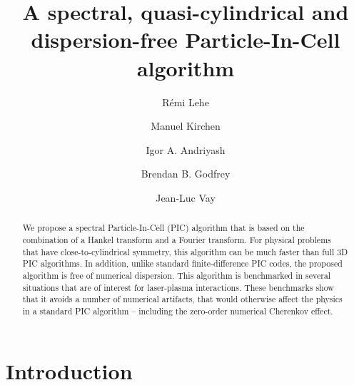 \documentclass[1p,times]{elsarticle}
\title{A spectral, quasi-cylindrical and dispersion-free Particle-In-Cell algorithm}
\author[label1]{R\'emi {Lehe}}
\author[label2]{Manuel {Kirchen}}
\author[label3]{Igor A. {Andriyash}}
\author[label4]{Brendan B. {Godfrey}}
\author[label1]{Jean-Luc {Vay}}
\begin{document}
\begin{abstract}
We propose a spectral Particle-In-Cell (PIC) algorithm that is based 
on the combination of a Hankel transform and a Fourier transform. 
For physical problems that have close-to-cylindrical symmetry, this
algorithm can be much faster than full 3D PIC algorithms. In addition,
unlike standard finite-difference PIC codes, the proposed algorithm is free of numerical
dispersion. This algorithm is benchmarked in several situations that
are of interest for laser-plasma interactions. These
benchmarks show that it avoids a number of numerical artifacts, that
would otherwise affect the physics in a standard PIC algorithm -- 
including the zero-order numerical Cherenkov effect.
\end{abstract}

\maketitle

\section*{Introduction}
\end{document}

